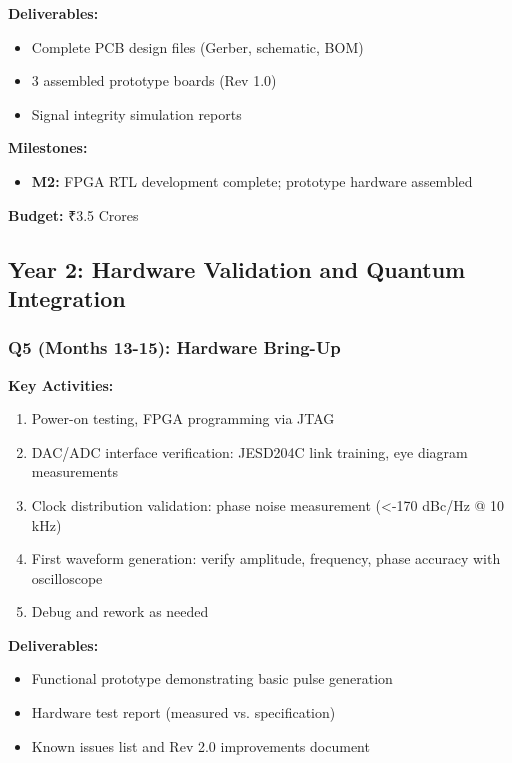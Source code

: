 \documentclass[12pt,a4paper]{article}
\begin{document}
\begin{enumerate}[leftmargin=*]
\textbf{Deliverables:}
\begin{itemize}[leftmargin=*]
    \item Complete PCB design files (Gerber, schematic, BOM)
    \item 3 assembled prototype boards (Rev 1.0)
    \item Signal integrity simulation reports
\end{itemize}

\textbf{Milestones:}
\begin{itemize}[leftmargin=*]
    \item \textbf{M2:} FPGA RTL development complete; prototype hardware assembled
\end{itemize}

\textbf{Budget:} ₹3.5 Crores

\subsection{Year 2: Hardware Validation and Quantum Integration}

\subsubsection{Q5 (Months 13-15): Hardware Bring-Up}

\textbf{Key Activities:}
\begin{enumerate}[leftmargin=*]
    \item Power-on testing, FPGA programming via JTAG
    \item DAC/ADC interface verification: JESD204C link training, eye diagram measurements
    \item Clock distribution validation: phase noise measurement (<-170 dBc/Hz @ 10 kHz)
    \item First waveform generation: verify amplitude, frequency, phase accuracy with oscilloscope
    \item Debug and rework as needed
\end{enumerate}

\textbf{Deliverables:}
\begin{itemize}[leftmargin=*]
    \item Functional prototype demonstrating basic pulse generation
    \item Hardware test report (measured vs. specification)
    \item Known issues list and Rev 2.0 improvements document
\end{itemize}


\end{enumerate}
\end{document}
